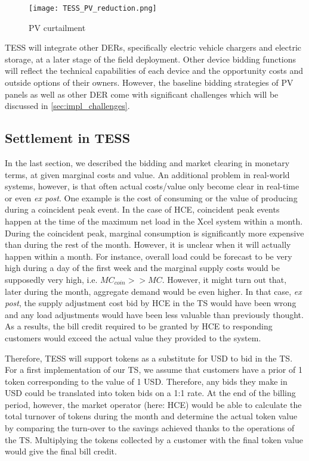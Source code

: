 \begin{figure}[t]
\centering
\texttt{[image: TESS\_PV\_reduction.png]}
\caption{PV curtailment}
\label{fig:pv_profile}
\end{figure}

TESS will integrate other DERs, specifically electric vehicle chargers and electric storage, at a later stage of the field deployment. Other device bidding functions will reflect the technical capabilities of each device and the opportunity costs and outside options of their owners. However, the baseline bidding strategies of PV panels as well as other DER come with significant challenges which will be discussed in \cref{sec:impl_challenges}.

\subsection{Settlement in TESS}\label{sec:hce_settlement}

In the last section, we described the bidding and market clearing in monetary terms, at given marginal costs and value. An additional problem in real-world systems, however, is that often actual costs/value only become clear in real-time or even  \textit{ex post}. One example is the cost of consuming or the value of producing during a coincident peak event. In the case of HCE, coincident  peak events happen at the time of the maximum net load in the Xcel system within a month. During the coincident peak, marginal consumption is significantly more expensive than during the rest of the month. However, it is unclear when it will actually happen within a month. For instance, overall load could be forecast to be very high during a day of the first week and the marginal supply costs would be supposedly very high, i.e. $MC_{coin} >> MC$. However, it might turn out that, later during the month, aggregate demand would be even higher. In that case, \textit{ex post}, the supply adjustment cost bid by HCE in the TS would have been wrong and any load adjustments would have been less valuable than previously thought. As a results, the bill credit required to be granted by HCE to responding customers would exceed the actual value they provided to the system.

Therefore, TESS will support tokens as a substitute for USD to bid in the TS. For a first implementation of our TS, we assume that customers have a prior of 1 token corresponding to the value of 1 USD. Therefore, any bids they make in USD could be translated into token bids on a 1:1 rate. 
At the end of the billing period, however, the market operator (here: HCE) would be able to calculate the total turnover of tokens during the month and determine the actual token value by comparing the turn-over to the savings achieved thanks to the operations of the TS. Multiplying the tokens collected by a customer with the final token value would give the final bill credit.

